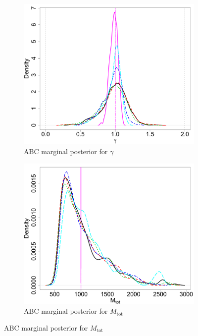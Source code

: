 \documentclass[ejs]{imsart}
\numberwithin{equation}{section}
\theoremstyle{plain}
\newcommand{\Mtot}{M_{\text{tot}}}
\begin{document}
\begin{figure}[htbp]
\begin{subfigure}{0.48\textwidth}
\end{subfigure} \\
\begin{subfigure}{0.48\textwidth}
\centering
\includegraphics[width = \textwidth]{figures/marg_gamma_obs.pdf} 
\caption{ABC marginal posterior for $\gamma$}\label{subfig:marg_gamma_obs}
\end{subfigure}
\begin{subfigure}{0.48\textwidth}
\centering
\includegraphics[width = \textwidth]{figures/marg_mtot_obs.pdf} 
\caption{ABC marginal posterior for  $\Mtot$}\label{subfig:marg_mtot_obs}

\end{subfigure}
\end{figure}
\end{document}
